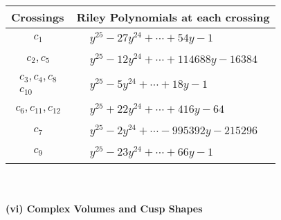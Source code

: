 \documentclass[1p]{elsarticle_modified}
\theoremstyle{definition}
\begin{document}
\begin{tabular}{m{50pt}|m{274pt}}
Crossings & \hspace{64pt}Riley Polynomials at each crossing \\
\hline $$\begin{aligned}c_{1}\end{aligned}$$&$\begin{aligned}
&y^{25}-27 y^{24}+\cdots+54 y-1
\end{aligned}$\\
\hline $$\begin{aligned}c_{2},c_{5}\end{aligned}$$&$\begin{aligned}
&y^{25}-12 y^{24}+\cdots+114688 y-16384
\end{aligned}$\\
\hline $$\begin{aligned}c_{3},c_{4},c_{8}\\c_{10}\end{aligned}$$&$\begin{aligned}
&y^{25}-5 y^{24}+\cdots+18 y-1
\end{aligned}$\\
\hline $$\begin{aligned}c_{6},c_{11},c_{12}\end{aligned}$$&$\begin{aligned}
&y^{25}+22 y^{24}+\cdots+416 y-64
\end{aligned}$\\
\hline $$\begin{aligned}c_{7}\end{aligned}$$&$\begin{aligned}
&y^{25}-2 y^{24}+\cdots-995392 y-215296
\end{aligned}$\\
\hline $$\begin{aligned}c_{9}\end{aligned}$$&$\begin{aligned}
&y^{25}-23 y^{24}+\cdots+66 y-1
\end{aligned}$\\
\hline
\end{tabular}\\~\\
\newpage\flushleft \textbf{(vi) Complex Volumes and Cusp Shapes}
\end{document}
